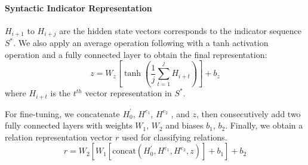 \documentclass[conference]{IEEEtran}
\begin{document}
\paragraph{Syntactic Indicator Representation}

\begin{math}H_{i+1}\end{math} to \begin{math}H_{i+j}\end{math} are the hidden state vectors corresponds to the indicator sequence \begin{math} S^* \end{math}. We also apply an average operation following with a tanh activation operation and a fully connected layer to obtain the final representation:
\begin{equation}
z=W_{z}\left[\tanh \left(\frac{1}{j} \sum_{t=1}^{j} H_{i+t}\right)\right]+b_{z}
\end{equation}
where \begin{math} H_{i+t} \end{math} is the \begin{math} t^{th} \end{math} vector representation in \begin{math} S^* \end{math}. 

For fine-tuning, we concatenate \begin{math}H_{0}^{\prime}\end{math}, \begin{math}H^{e_1}\end{math}, \begin{math}H^{e_2}\end{math} , and \begin{math} z \end{math}, then consecutively add two fully connected layers with weights \begin{math} W_{1} \end{math}, \begin{math} W_{2} \end{math} and biases \begin{math} b_{1} \end{math}, \begin{math} b_{2} \end{math}. Finally, we obtain a relation representation vector \begin{math} r \end{math} used for classifying relations.
\begin{equation}
r=W_{2}\left[W_{1}\left[\text{concat} \left(H_{0}^{\prime}, H^{e_1}, H^{e_2}, z\right)\right]+b_{1}\right]+b_{2}
\end{equation}
\end{document}
